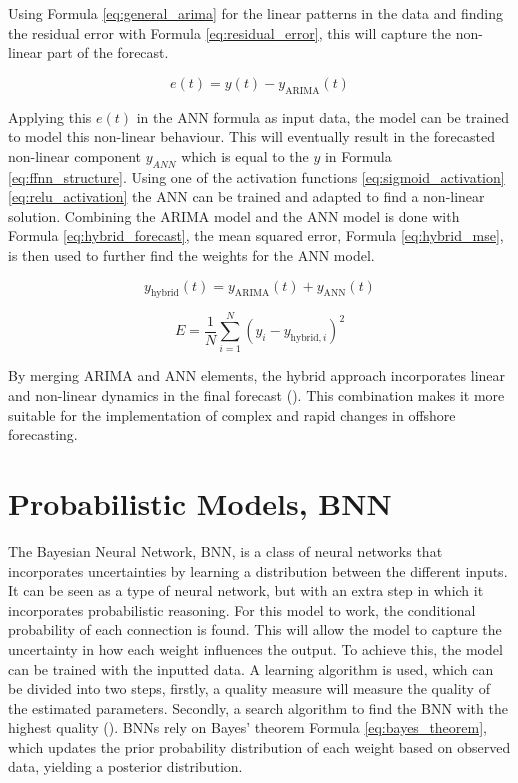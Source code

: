 \noindent Using Formula \ref{eq:general_arima} for the linear patterns in the data and finding the residual error with Formula \ref{eq:residual_error}, this will capture the non-linear part of the forecast. 

\begin{equation}
    e(t) = y(t) - y_{\text{ARIMA}}(t)
    \label{eq:residual_error}
\end{equation}

\noindent Applying this $e(t)$ in the ANN formula as input data, the model can be trained to model this non-linear behaviour. This will eventually result in the forecasted non-linear component $y_{ANN}$ which is equal to the $y$ in Formula \ref{eq:ffnn_structure}. Using one of the activation functions \ref{eq:sigmoid_activation} \ref{eq:relu_activation} the ANN can be trained and adapted to find a non-linear solution. Combining the ARIMA model and the ANN model is done with Formula \ref{eq:hybrid_forecast}, the mean squared error, Formula \ref{eq:hybrid_mse}, is then used to further find the weights for the ANN model.

\begin{equation}
    y_{\text{hybrid}}(t) = y_{\text{ARIMA}}(t) + y_{\text{ANN}}(t)
    \label{eq:hybrid_forecast}
\end{equation}

\begin{equation}
    E = \frac{1}{N} \sum_{i=1}^{N} \left(y_i - y_{\text{hybrid}, i}\right)^2
    \label{eq:hybrid_mse}
\end{equation}

\noindent By merging ARIMA and ANN elements, the hybrid approach incorporates linear and non-linear dynamics in the final forecast (\cite{zhang2003time}). This combination makes it more suitable for the implementation of complex and rapid changes in offshore forecasting.

\section{Probabilistic Models, BNN}
\label{lit:probabilistic_model}
The Bayesian Neural Network, BNN, is a class of neural networks that incorporates uncertainties by learning a distribution between the different inputs. It can be seen as a type of neural network, but with an extra step in which it incorporates probabilistic reasoning. For this model to work, the conditional probability of each connection is found. This will allow the model to capture the uncertainty in how each weight influences the output. To achieve this, the model can be trained with the inputted data. A learning algorithm is used, which can be divided into two steps, firstly, a quality measure will measure the quality of the estimated parameters. Secondly, a search algorithm to find the BNN with the highest quality (\cite{cofino2002bayesian}). BNNs rely on Bayes’ theorem Formula \ref{eq:bayes_theorem}, which updates the prior probability distribution of each weight based on observed data, yielding a posterior distribution.  

